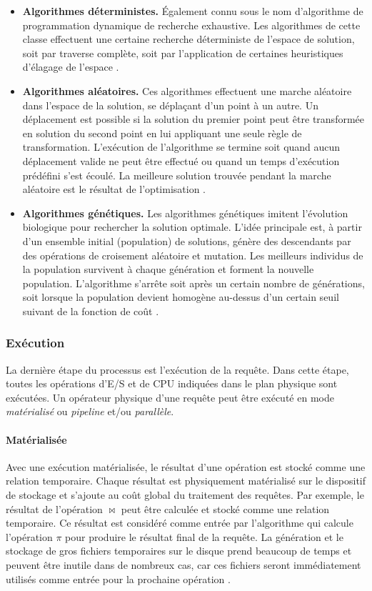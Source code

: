\begin{itemize}
 \item \textbf{Algorithmes déterministes.} Également connu sous le nom d'algorithme de programmation dynamique de recherche exhaustive. Les algorithmes de cette classe effectuent une certaine recherche déterministe de l'espace de solution, soit par traverse complète, soit par l'application de certaines heuristiques d'élagage de l'espace \cite{Selinger79,Steinbrunn97}.
 \item \textbf{Algorithmes aléatoires.} Ces algorithmes effectuent une marche aléatoire dans l'espace de la solution, se déplaçant d'un point à un autre. Un déplacement est possible si la solution du premier point peut être transformée en solution du second point en lui appliquant une seule règle de transformation. L'exécution de l'algorithme se termine soit quand aucun déplacement valide ne peut être effectué ou quand un temps d'exécution prédéfini s'est écoulé. La meilleure solution trouvée pendant la marche aléatoire est le résultat de l'optimisation \cite{Ioannidis87,Ioannidis90}.
 \item \textbf{Algorithmes génétiques.} Les algorithmes génétiques imitent l'évolution biologique pour rechercher la solution optimale. L'idée principale est, à partir d'un ensemble initial (population) de solutions, génère des descendants par des opérations de croisement aléatoire et mutation. Les meilleurs individus de la population survivent à chaque génération et forment la nouvelle population. L'algorithme s'arrête soit après un certain nombre de générations, soit lorsque la population devient homogène au-dessus d'un certain seuil suivant de la fonction de coût \cite{Bennett91,Stillger96}.
\end{itemize}

\subsubsection{Exécution}
La dernière étape du processus est l'exécution de la requête. Dans cette étape, toutes les opérations d'E/S et de CPU indiquées dans le plan physique sont exécutées.
Un opérateur physique d'une requête peut être exécuté en mode \textit{matérialisé} ou \textit{pipeline} et/ou \textit{parallèle}.

\paragraph{Matérialisée}
Avec une exécution matérialisée, le résultat d'une opération est stocké comme une relation temporaire. Chaque résultat est physiquement matérialisé sur le dispositif de stockage et s'ajoute au coût global du traitement des requêtes. Par exemple, le résultat de l'opération $\bowtie$ peut être calculée et stocké comme une relation temporaire. Ce résultat est considéré comme entrée par l'algorithme qui calcule l'opération $\pi$ pour produire le résultat final de la requête. La génération et le stockage de gros fichiers temporaires sur le disque prend beaucoup de temps et peuvent être inutile dans de nombreux cas, car ces fichiers seront immédiatement utilisés comme entrée pour la prochaine opération \cite{Elmasri08}.

